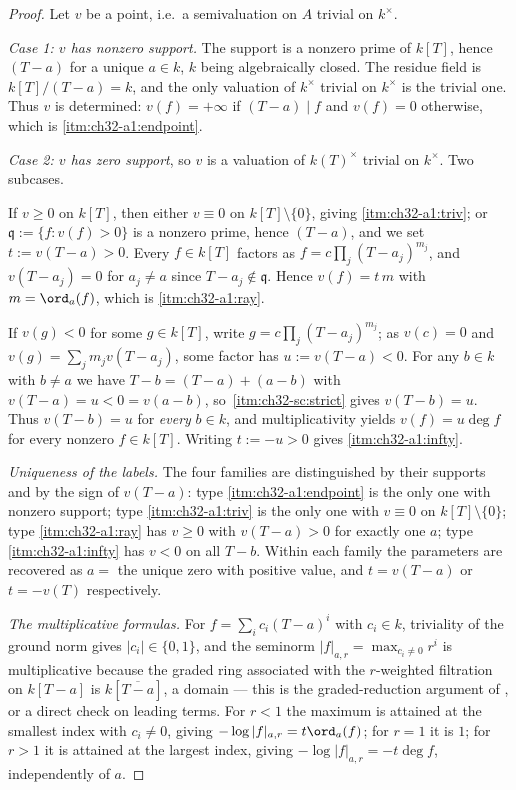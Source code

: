 \begin{proof}
Let $v$ be a point, i.e.\ a semivaluation on $A$ trivial on $k^\times$.

\emph{Case 1: $v$ has nonzero support.}  The support is a nonzero prime of
$k[T]$, hence $(T-a)$ for a unique $a\in k$, $k$ being algebraically
closed.  The residue field is $k[T]/(T-a)=k$, and the only valuation of
$k^\times$ trivial on $k^\times$ is the trivial one.  Thus $v$ is
determined: $v(f)=+\infty$ if $(T-a)\mid f$ and $v(f)=0$ otherwise,
which is \cref{itm:ch32-a1:endpoint}.

\emph{Case 2: $v$ has zero support}, so $v$ is a valuation of
$k(T)^\times$ trivial on $k^\times$.  Two subcases.

If $v\geq0$ on $k[T]$, then either $v\equiv0$ on
$k[T]\setminus\{0\}$, giving \cref{itm:ch32-a1:triv}; or
$\mathfrak q:=\{f:v(f)>0\}$ is a nonzero prime, hence $(T-a)$, and we set
$t:=v(T-a)>0$.  Every $f\in k[T]$ factors as
$f=c\prod_j(T-a_j)^{m_j}$, and $v(T-a_j)=0$ for $a_j\neq a$ since
$T-a_j\notin\mathfrak q$.  Hence $v(f)=t\,m$ with $m=\ord_a(f)$, which
is \cref{itm:ch32-a1:ray}.

If $v(g)<0$ for some $g\in k[T]$, write $g=c\prod_j(T-a_j)^{m_j}$; as
$v(c)=0$ and $v(g)=\sum_jm_jv(T-a_j)$, some factor has
$u:=v(T-a)<0$.  For any $b\in k$ with $b\neq a$ we have
$T-b=(T-a)+(a-b)$ with $v(T-a)=u<0=v(a-b)$, so
\,\cref{itm:ch32-sc:strict} gives
$v(T-b)=u$.  Thus $v(T-b)=u$ for \emph{every} $b\in k$, and
multiplicativity yields $v(f)=u\deg f$ for every nonzero
$f\in k[T]$.  Writing $t:=-u>0$ gives \cref{itm:ch32-a1:infty}.

\emph{Uniqueness of the labels.}  The four families are distinguished by
their supports and by the sign of $v(T-a)$: type
\cref{itm:ch32-a1:endpoint} is the only one with nonzero support; type
\cref{itm:ch32-a1:triv} is the only one with $v\equiv0$ on
$k[T]\setminus\{0\}$; type \cref{itm:ch32-a1:ray} has $v\geq0$ with
$v(T-a)>0$ for exactly one $a$; type \cref{itm:ch32-a1:infty} has
$v<0$ on all $T-b$.  Within each family the parameters are recovered as
$a=$ the unique zero with positive value, and $t=v(T-a)$ or
$t=-v(T)$ respectively.

\emph{The multiplicative formulas.}  For $f=\sum_ic_i(T-a)^i$ with
$c_i\in k$, triviality of the ground norm gives $|c_i|\in\{0,1\}$, and
the seminorm $|f|_{a,r}=\max_{c_i\neq0}r^i$ is multiplicative because the
graded ring associated with the $r$-weighted filtration on $k[T-a]$ is
$k[\overline{T-a}]$, a domain --- this is the graded-reduction argument of
, or a direct check on leading terms.  For $r<1$ the
maximum is attained at the smallest index with $c_i\neq0$, giving
$-\log|f|_{a,r}=t\ord_a(f)$; for $r=1$ it is $1$; for $r>1$ it is
attained at the largest index, giving $-\log|f|_{a,r}=-t\deg f$,
independently of $a$.
\end{proof}

